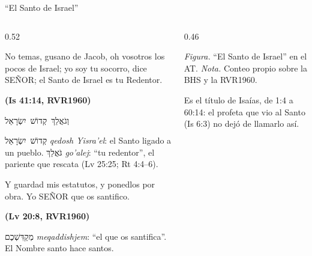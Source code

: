\documentclass[hyperref={bookmarks=false},aspectratio=169]{beamer}
\let\raggedright\justifying
\newcommand{\heb}[1]{\mbox{\foreignlanguage{hebrew}{#1}}}
\newcommand{\SENOR}{S{\fontsize{0.78em}{1em}\selectfont EÑOR}}
\newcommand{\fuente}[1]{\par\hfill{\upshape\bfseries\footnotesize\textcolor{azul}{#1}}}
\begin{document}
\begin{frame}{``El Santo de Israel''}
\begin{columns}[c,onlytextwidth]
\begin{column}{0.52\textwidth}
\begin{cita}No temas, gusano de Jacob, oh vosotros los pocos de Israel; yo soy tu socorro, dice \SENOR{}; el Santo de Israel es tu Redentor.\fuente{(Is 41:14, RVR1960)}\end{cita}
\begin{center}\small\heb{וְגֹאֲלֵךְ קְדוֹשׁ יִשְׂרָאֵל}\end{center}
\scriptsize \heb{קְדוֹשׁ יִשְׂרָאֵל} \emph{qedosh Yisra'el}: el Santo ligado a un pueblo. \heb{גֹּאֲלֵךְ} \emph{go'alej}: ``tu redentor'', el pariente que rescata (Lv 25:25; Rt 4:4--6).
\begin{cita}Y guardad mis estatutos, y ponedlos por obra. Yo \SENOR{} que os santifico.\fuente{(Lv 20:8, RVR1960)}\end{cita}
\scriptsize \heb{מְקַדִּשְׁכֶם} \emph{meqaddishjem}: ``el que os santifica''. El Nombre santo hace santos.
\end{column}
\begin{column}{0.46\textwidth}
\centering
{}\par\smallskip
{\tiny\color{gris}\textit{Figura.} ``El Santo de Israel'' en el AT. \textit{Nota.} Conteo propio sobre la BHS y la RVR1960.}\par\medskip
\raggedright\scriptsize Es el título de Isaías, de 1:4 a 60:14: el profeta que vio al Santo (Is 6:3) no dejó de llamarlo así.
\end{column}
\end{columns}
\end{frame}
\end{document}
